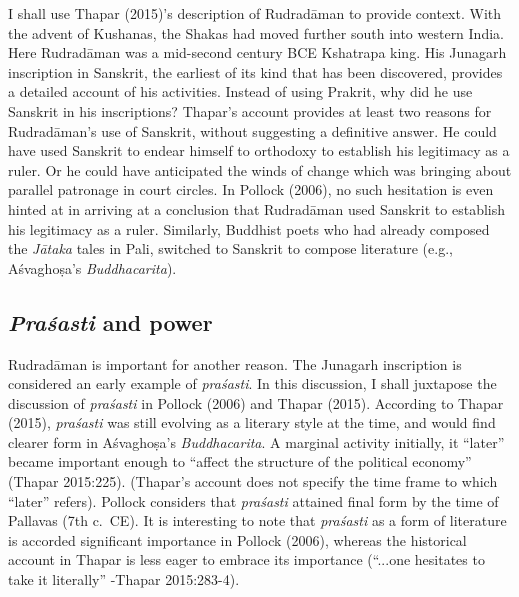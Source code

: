 I shall use Thapar (2015)’s description of Rudradāman to provide context. With the advent of Kushanas, the Shakas had moved further south into western India. Here Rudradāman was a mid-second century BCE Kshatrapa king. His Junagarh inscription in Sanskrit, the earliest of its kind that has been discovered, provides a detailed account of his activities. Instead of using Prakrit, why did he use Sanskrit in his inscriptions? Thapar’s account provides at least two reasons for Rudradāman’s use of Sanskrit, without suggesting a definitive answer. He could have used Sanskrit to endear himself to orthodoxy to establish his legitimacy as a ruler. Or he could have anticipated the winds of change which was bringing about parallel patronage in court circles. In Pollock (2006), no such hesitation is even hinted at in arriving at a conclusion that Rudradāman used Sanskrit to establish his legitimacy as a ruler. Similarly, Buddhist poets who had already composed the {\sl Jātaka} tales in Pali, switched to Sanskrit to compose literature (e.g., Aśvaghoṣa’s {\sl Buddhacarita}). 

\subsection{{\sl Praśasti} and power}

Rudradāman is important for another reason. The Junagarh inscription is considered an early example of {\sl praśasti}. In this discussion, I shall juxtapose the discussion of {\sl praśasti} in Pollock (2006) and Thapar (2015). According to Thapar (2015), {\sl praśasti} was still evolving as a literary style at the time, and would find clearer form in Aśvaghoṣa’s {\sl Buddhacarita}. A marginal activity initially, it “later” became important enough to “affect the structure of the political economy” (Thapar 2015:225). (Thapar’s account does not specify the time frame to which “later” refers). Pollock considers that {\sl praśasti} attained final form by the time of Pallavas (7th c.\ CE). It is interesting to note that {\sl praśasti} as a form of literature is accorded significant importance in Pollock (2006), whereas the historical account in Thapar is less eager to embrace its importance (“...one hesitates to take it literally” -Thapar 2015:283-4).

